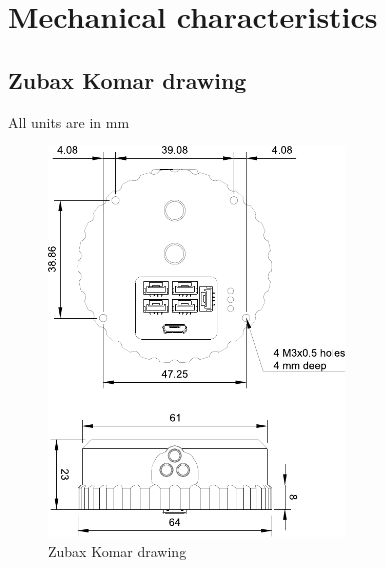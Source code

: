 \chapter{Mechanical characteristics}

\section{Zubax Komar drawing}
All units are in mm
\begin{figure}[!hbt]
    \centering
    \includegraphics[width=0.7\textwidth]{figures/mechanical drawing.pdf}
    \caption{Zubax Komar drawing}
\end{figure}